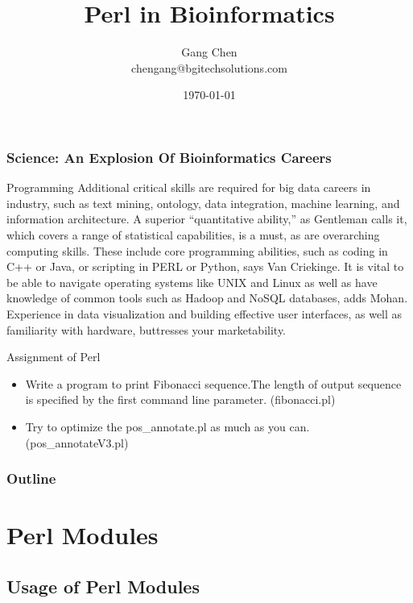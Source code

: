 \documentclass[UTF8]{beamer}
\title{Perl in Bioinformatics}
\author{Gang Chen\\ chengang@bgitechsolutions.com}
\date{\today}
\begin{document}
\begin{frame}
  \frametitle{Science: An Explosion Of Bioinformatics Careers}
\begin{block}{Programming}
  \small
  Additional critical skills are required for big data careers in industry, such
   as text mining, ontology, data integration, machine learning, and information
    architecture. A superior “quantitative ability,” as Gentleman calls it,
    which covers a range of statistical capabilities, is a must, as are
    overarching computing skills. These include core programming abilities,
    such as coding in C++ or Java, or scripting in PERL or Python, says Van
    Criekinge. It is vital to be able to navigate operating systems like UNIX
    and Linux as well as have knowledge of common tools such as Hadoop and NoSQL
     databases, adds Mohan. Experience in data visualization and building
     effective user interfaces, as well as familiarity with hardware, buttresses
    your marketability.
\end{block}
\end{frame}

\begin{frame}
\begin{block}{Assignment of Perl}
\begin{itemize}
\item Write a program to print Fibonacci sequence.The length of output sequence
is specified by the first command line parameter. (fibonacci.pl)
\item Try to optimize the pos_annotate.pl as much as you can. (pos_annotateV3.pl)
\end{itemize}
\end{block}
\end{frame}

\begin{frame}
\titlepage
\end{frame}
\begin{frame}[t]\frametitle{Outline}
\tableofcontents[hideallsubsections]
\end{frame}

\section{Perl Modules}

\subsection{Usage of Perl Modules}
\end{document}
